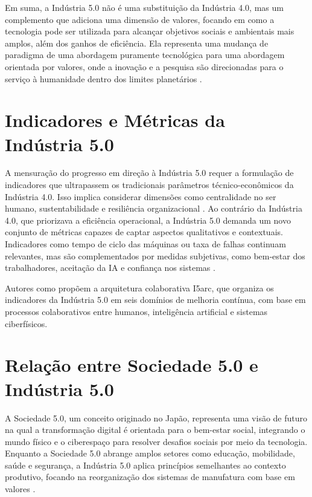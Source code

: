 Em suma, a Indústria 5.0 não é uma substituição da Indústria 4.0, mas um complemento que adiciona uma dimensão de valores, focando em como a tecnologia pode ser utilizada para alcançar objetivos sociais e ambientais mais amplos, além dos ganhos de eficiência.
Ela representa uma mudança de paradigma de uma abordagem puramente tecnológica para uma abordagem orientada por valores, onde a inovação e a pesquisa são direcionadas para o serviço à humanidade dentro dos limites planetários \cite{Xu2021, VALETTE2023}.

\section{Indicadores e Métricas da Indústria 5.0}

A mensuração do progresso em direção à Indústria 5.0 requer a formulação de indicadores que ultrapassem os tradicionais parâmetros técnico-econômicos da Indústria 4.0.
Isso implica considerar dimensões como centralidade no ser humano, sustentabilidade e resiliência organizacional \cite{euCommission2021, Nahavandi2019}.
Ao contrário da Indústria 4.0, que priorizava a eficiência operacional, a Indústria 5.0 demanda um novo conjunto de métricas capazes de captar aspectos qualitativos e contextuais.
Indicadores como tempo de ciclo das máquinas ou taxa de falhas continuam relevantes, mas são complementados por medidas subjetivas, como bem-estar dos trabalhadores, aceitação da IA e confiança nos sistemas \cite{TOTH2023}.

Autores como  propõem a arquitetura colaborativa I5arc, que organiza os indicadores da Indústria 5.0 em seis domínios de melhoria contínua, com base em processos colaborativos entre humanos, inteligência artificial e sistemas ciberfísicos.


\section{Relação entre Sociedade 5.0 e Indústria 5.0}

A Sociedade 5.0, um conceito originado no Japão, representa uma visão de futuro na qual a transformação digital é orientada para o bem-estar social, integrando o mundo físico e o ciberespaço para resolver desafios sociais por meio da tecnologia.
Enquanto a Sociedade 5.0 abrange amplos setores como educação, mobilidade, saúde e segurança, a Indústria 5.0 aplica princípios semelhantes ao contexto produtivo, focando na reorganização dos sistemas de manufatura com base em valores \cite{Santos2025,Xu2021}.

